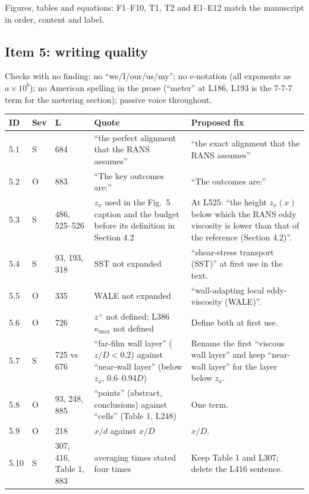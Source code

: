 \documentclass[10pt]{article}
\newcommand{\Sf}{S}
\newcommand{\Op}{O}
\begin{document}
Figures, tables and equations: F1--F10, T1, T2 and E1--E12 match the manuscript in order, content and label.

\subsection{Item 5: writing quality}

Checks with no finding: no ``we/I/our/us/my''; no e-notation (all exponents as $a\times10^{b}$); no American
spelling in the prose (``meter'' at L186, L193 is the 7-7-7 term for the metering section); passive voice
throughout.

{\small
\begin{longtable}{@{}l l L{1.5cm} L{5.0cm} L{6.6cm}@{}}
\toprule
ID & Sev & L & Quote & Proposed fix \\
\midrule
{} & \Sf & 684 & ``the perfect alignment that the RANS assumes'' & ``the exact alignment that the RANS assumes'' \\
5.2 & \Op & 883 & ``The key outcomes are:'' & ``The outcomes are:'' \\
5.3 & \Sf & 486, 525--526 & $z_x$ used in the Fig.~5 caption and the budget before its definition in Section 4.2 &
At L525: ``the height $z_x(x)$ below which the RANS eddy viscosity is lower than that of the reference (Section
4.2)''. \\
5.4 & \Sf & 93, 193, 318 & SST not expanded & ``shear-stress transport (SST)'' at first use in the text. \\
5.5 & \Op & 335 & WALE not expanded & ``wall-adapting local eddy-viscosity (WALE)''. \\
5.6 & \Op & 726 & $z^+$ not defined; L386 $\kappa_{\max}$ not defined & Define both at first use. \\
5.7 & \Sf & 725 vs 676 & ``far-film wall layer'' ($z/D<0.2$) against ``near-wall layer'' (below $z_x$, 0.6--0.94$D$)
& Rename the first ``viscous wall layer'' and keep ``near-wall layer'' for the layer below $z_x$. \\
5.8 & \Op & 93, 248, 885 & ``points'' (abstract, conclusions) against ``cells'' (Table 1, L248) & One term. \\
5.9 & \Op & 218 & $x/d$ against $x/D$ & $x/D$. \\
5.10 & \Sf & 307, 416, Table 1, 883 & averaging times stated four times & Keep Table 1 and L307; delete the L416
sentence. \\
\bottomrule
\end{longtable}}
\end{document}
